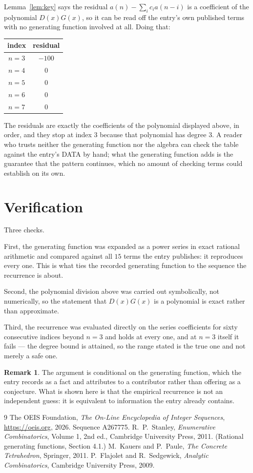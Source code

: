 \documentclass[11pt,a4paper]{article}
\theoremstyle{plain}
\theoremstyle{definition}
\newtheorem{remark}[theorem]{Remark}
\begin{document}
Lemma~\ref{lem:key} says the residual $a(n)-\sum_ic_ia(n-i)$ is a coefficient of the
polynomial $D(x)G(x)$, so it can be read off the entry's own published terms with no
generating function involved at all. Doing that:
\begin{center}
\begin{tabular}{cc}
index & residual \\ \hline
$n=3$ & $-100$ \\
$n=4$ & $0$ \\
$n=5$ & $0$ \\
$n=6$ & $0$ \\
$n=7$ & $0$
\end{tabular}
\end{center}
The residuals are exactly the coefficients of the polynomial displayed above, in order, and
they stop at index $3$ because that polynomial has degree $3$. A reader who trusts
neither the generating function nor the algebra can check the table against the entry's DATA
by hand; what the generating function adds is the guarantee that the pattern continues, which
no amount of checking terms could establish on its own.

\section{Verification}

Three checks.

First, the generating function was expanded as a power series in exact rational arithmetic and
compared against all $15$ terms the entry publishes: it reproduces every one. This is
what ties the recorded generating function to the sequence the recurrence is about.

Second, the polynomial division above was carried out symbolically, not numerically, so the
statement that $D(x)G(x)$ is a polynomial is exact rather than approximate.

Third, the recurrence was evaluated directly on the series coefficients for sixty consecutive
indices beyond $n=3$ and holds at every one, and at $n=3$ itself it fails --- the
degree bound is attained, so the range stated is the true one and not merely a safe one.

\begin{remark}
The argument is conditional on the generating function, which the entry records as a fact and
attributes to a contributor rather than offering as a conjecture. What is shown here is that
the empirical recurrence is not an independent guess: it is equivalent to information the
entry already contains.
\end{remark}

\begin{thebibliography}{9}
 The OEIS Foundation, \emph{The On-Line Encyclopedia of Integer
Sequences}, \url{https://oeis.org}, 2026. Sequence A267775.
 R.~P.~Stanley, \emph{Enumerative Combinatorics}, Volume 1, 2nd ed.,
Cambridge University Press, 2011. (Rational generating functions, Section 4.1.)
 M.~Kauers and P.~Paule, \emph{The Concrete Tetrahedron}, Springer, 2011.
 P.~Flajolet and R.~Sedgewick, \emph{Analytic Combinatorics}, Cambridge
University Press, 2009.
\end{thebibliography}
\end{document}
